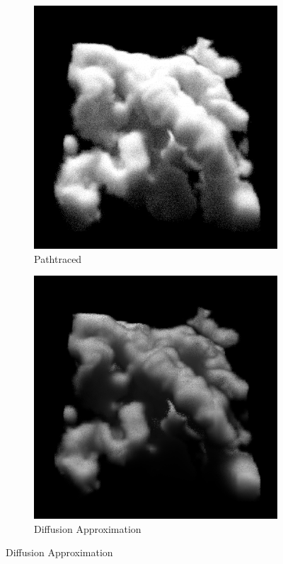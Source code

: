 \begin{figure}[h]
\centering
\begin{subfigure}[t]{0.48\columnwidth}
\includegraphics[width=\columnwidth]{04_pn_method/results/nebulae_ms_groundtruth.png}
\caption{Pathtraced}
\label{fig:pn_results_nebulae1_pathtraced}
\end{subfigure}
\hspace{0.01\columnwidth}
\begin{subfigure}[t]{0.48\columnwidth}
\includegraphics[width=\columnwidth]{05_diffusion_approximation/results/nebulae_ms_cda.png}
\caption{Diffusion Approximation}
\label{fig:pn_results_nebulae1_P1}
\end{subfigure}


\end{figure}
